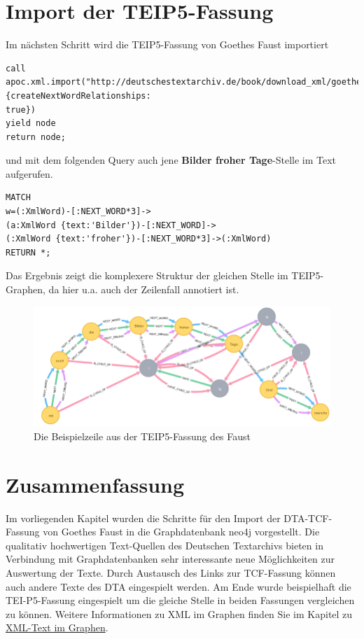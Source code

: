 \documentclass[ngerman,]{scrreprt}
\begin{document}
\section{Import der TEIP5-Fassung}\label{import-der-teip5-fassung}

Im nächsten Schritt wird die TEIP5-Fassung von Goethes Faust importiert

\begin{verbatim}
call
apoc.xml.import("http://deutschestextarchiv.de/book/download_xml/goethe_faust01_1808",{createNextWordRelationships:
true})
yield node
return node;
\end{verbatim}

und mit dem folgenden Query auch jene \textbf{Bilder froher Tage}-Stelle im Text aufgerufen.

\begin{verbatim}
MATCH
w=(:XmlWord)-[:NEXT_WORD*3]->
(a:XmlWord {text:'Bilder'})-[:NEXT_WORD]->
(:XmlWord {text:'froher'})-[:NEXT_WORD*3]->(:XmlWord)
RETURN *;
\end{verbatim}

Das Ergebnis zeigt die komplexere Struktur der gleichen Stelle im TEIP5-Graphen, da hier u.a. auch der Zeilenfall annotiert ist.

\begin{figure}
\centering
\includegraphics{Bilder/TEI2Graph/BilderFroherTageP5.png}
\caption{Die Beispielzeile aus der TEIP5-Fassung des Faust}
\end{figure}

\section{Zusammenfassung}\label{zusammenfassung-4}

Im vorliegenden Kapitel wurden die Schritte für den Import der DTA-TCF-Fassung von Goethes Faust in die Graphdatenbank neo4j vorgestellt. Die qualitativ hochwertigen Text-Quellen des Deutschen Textarchivs bieten in Verbindung mit Graphdatenbanken sehr interessante neue Möglichkeiten zur Auswertung der Texte. Durch Austausch des Links zur TCF-Fassung können auch andere Texte des DTA eingespielt werden. Am Ende wurde beispielhaft die TEI-P5-Fassung eingespielt um die gleiche Stelle in beiden Fassungen vergleichen zu können. Weitere Informationen zu XML im Graphen finden Sie im Kapitel zu \href{https://kuczera.github.io/Graphentechnologien/60_XML-Text-im-Graphen.html}{XML-Text im Graphen}.
\end{document}
